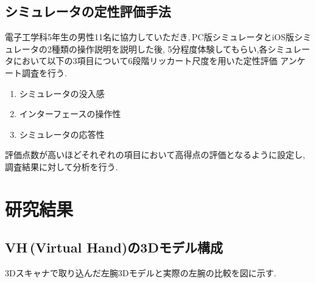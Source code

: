 \documentclass{ltjsreport}
\begin{document}
	\section{シミュレータの定性評価手法}
		電子工学科5年生の男性11名に協力していただき,\,PC版シミュレータとiOS版シミュレータの2種類の操作説明を説明した後,
		5分程度体験してもらい,各シミュレータにおいて以下の3項目について6段階リッカート尺度を用いた定性評価
		アンケート調査を行う.
		\vspace{-2pt}
		\begin{enumerate}
			\item シミュレータの没入感
			\item インターフェースの操作性
			\item シミュレータの応答性
		\end{enumerate}
		\vspace{-2pt}
		評価点数が高いほどそれぞれの項目において高得点の評価となるように設定し,調査結果に対して分析を行う.

\chapter{研究結果}
	\section{VH\,(Virtual Hand)の3Dモデル構成}
		3Dスキャナで取り込んだ左腕3Dモデルと実際の左腕の比較を図に示す.
\end{document}
